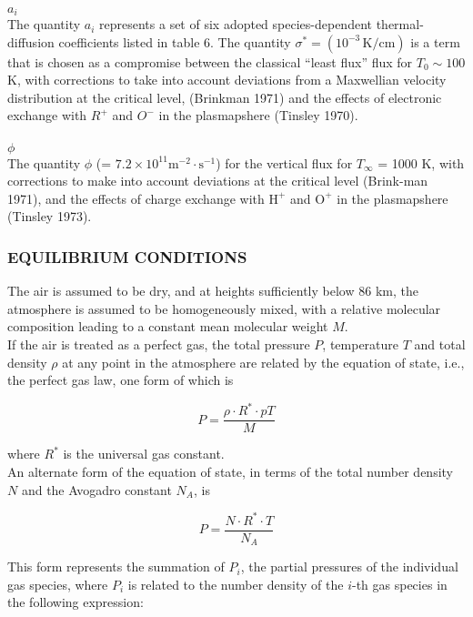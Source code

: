 \documentclass{article}
\begin{document}
\\$a_i$\\
The quantity $a_i$ represents a set of six adopted species-dependent thermal-diffusion coefficients listed in table 6. The quantity $\sigma^* = (10^{-3}\, \mathrm{K/cm})$ is a term that is chosen as a compromise between the classical “least flux” flux for $T_{0} \sim 100$ K, with corrections to take into account deviations from a Maxwellian velocity distribution at the critical level, (Brinkman 1971) and the effects of electronic exchange with $R^+$ and $O^-$ in the plasmapshere (Tinsley 1970).\\
\\$\phi$\\
The quantity $\phi$ (= $7.2\times 10^{11}\text{m}^{-2} \cdot \text{s}^{-1}$) for the vertical flux for $T _\infty$ = 1000 K, with corrections to make into account deviations at the critical level (Brink-man 1971), and the effects of charge exchange with $\text{H}^+$ and $\text{O}^+$ in the plasmapshere (Tinsley 1973).
\subsubsection{EQUILIBRIUM CONDITIONS} 
The air is assumed to be dry, and at heights sufficiently below 86 km, the atmosphere is assumed to be homogeneously mixed, with a relative molecular composition leading to a constant mean molecular weight $M$. \\
If the air is treated as a perfect gas, the total pressure $P$, temperature $T$ and total density $\rho$ at any point in the atmosphere are related by the equation of state, i.e., the perfect gas law, one form of which is

\begin{equation}
  P = \frac{\rho \cdot R^* \cdot pT}{M} \tag{1}
\end{equation}

where $R^*$ is the universal gas constant. \\
An alternate form of the equation of state, in terms of the total number density $N$ and the Avogadro constant $N_A$, is

\begin{equation}
  P = \frac{N \cdot R^* \cdot T}{N_A} \tag{2}
\end{equation}

This form represents the summation of $P_i$, the partial pressures of the individual gas species, where $P_i$ is related to the number density of the $i$-th gas species in the following expression:
\end{document}
